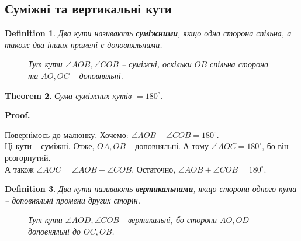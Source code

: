 \documentclass[a4paper, 10pt]{article}
\makeatletter
\def\qed{$\blacksquare$}
\theoremstyle{theoremdd}
\newtheorem{theorem}{Theorem}[subsection]
\theoremstyle{theoremdd}
\theoremstyle{theoremdd}
\newtheorem{definition}[theorem]{Definition}
\theoremstyle{theoremdd}
\theoremstyle{theoremdd}
\theoremstyle{theoremdd}
\theoremstyle{theoremdd}
\theoremstyle{theoremdd}
\theoremstyle{theoremdd}
\renewenvironment{proof}[1][Proof.\\]{\par
\pushQED{\hfill \qed}%
\normalfont \topsep6\p@\@plus6\p@\relax
\trivlist
\item\relax
{\bfseries
#1\@addpunct{.}}\hspace\labelsep\ignorespaces
}{%
\popQED\endtrivlist\@endpefalse
}
\makeatother
\begin{document}
\subsection{Суміжні та вертикальні кути}
\begin{definition}
Два кути називають \textbf{суміжними}, якщо одна сторона спільна, а також два інших промені є доповняльними.
\begin{figure}[H]
\centering
{}
\caption*{Тут кути $\angle AOB, \angle COB$ -- суміжні, оскільки $OB$ спільна сторона та $AO,OC$ -- доповняльні.}
\end{figure}
\end{definition}

\begin{theorem}
Сума суміжних кутів $= 180^{\circ}$.
\end{theorem}

\begin{proof}
Повернімось до малюнку. Хочемо: $\angle AOB + \angle COB = 180^{\circ}$.\\
Ці кути -- суміжні. Отже, $OA,OB$ -- доповняльні. А тому $\angle AOC = 180^{\circ}$, бо він -- розгорнутий.\\
А також $\angle AOC = \angle AOB + \angle COB$. Остаточно, $\angle AOB + \angle COB = 180^{\circ}$.
\end{proof}

\begin{definition}
Два кути називають \textbf{вертикальними}, якщо сторони одного кута -- доповняльні промени других сторін.
\begin{figure}[H]
\centering
{}
\caption*{Тут кути $\angle AOD, \angle COB$ - вертикальні, бо сторони $AO,OD$ -- доповняльні до $OC, OB$.}
\end{figure}
\end{definition}
\end{document}
